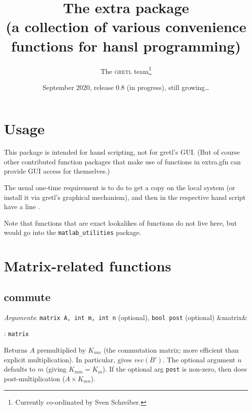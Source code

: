 \documentclass[11pt,english]{article}
\newcommand{\noun}[1]{\textsc{#1}}
\newcommand{\ArgRet}[2]{%
  {\it Arguments}: {#1}%
  \ifx&#2&%
  \else
  \par\smallskip\noindent {\it Return type}: \texttt{#2}
  \fi%
  \par\medskip\par%
  }
\begin{document}
\title{The extra package\\
(a collection of various convenience functions for hansl programming) }

\date{September 2020, release 0.8 (in progress), still growing\ldots }

\author{The \noun{gretl} team\thanks{Currently co-ordinated by Sven Schreiber.}}

\maketitle
\tableofcontents{}

\section{Usage}

This package is intended for hansl scripting, not for gretl's GUI.
(But of course other contributed function packages that make use of
functions in extra.gfn can provide GUI access for themselves.)

The usual one-time requirement is to do 
to get a copy on the local system (or install it via gretl's graphical
mechanism), and then in the respective hansl script have a line .

Note that functions that are exact lookalikes of 
functions do not live here, but would go into the
\texttt{matlab\_utilities} package.


\section{Matrix-related functions}

\subsection{commute}

\ArgRet{\texttt{matrix A, int m, int n} (optional), \texttt{bool
post} (optional)}{matrix}

Returns $A$ premultiplied by $K_{mn}$ (the commutation matrix; more
efficient than explicit multiplication). In particular,  gives $vec(B')$. The optional argument $n$ defaults to
$m$ (giving $K_{mm}=K_{m}$). If the optional arg \texttt{post} is
non-zero, then does post-multiplication ($A\times K_{mn}$). 
\end{document}
